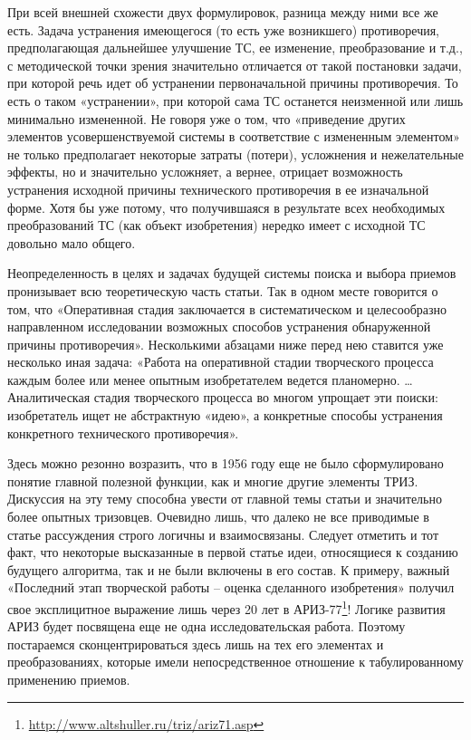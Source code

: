 \documentclass[11pt,a4paper]{article}
\begin{document}
При всей внешней схожести двух формулировок, разница между ними все же
есть. Задача устранения имеющегося (то есть уже возникшего) противоречия,
предполагающая дальнейшее улучшение ТС, ее изменение, преобразование и т.д., с
методической точки зрения значительно отличается от такой постановки задачи,
при которой речь идет об устранении первоначальной причины противоречия. То
есть о таком «устранении», при которой сама ТС останется неизменной или лишь
минимально измененной. Не говоря уже о том, что «приведение других элементов
усовершенствуемой системы в соответствие с измененным элементом» не только
предполагает некоторые затраты (потери), усложнения и нежелательные эффекты,
но и значительно усложняет, а вернее, отрицает возможность устранения исходной
причины технического противоречия в ее изначальной форме. Хотя бы уже потому,
что получившаяся в результате всех необходимых преобразований ТС (как объект
изобретения) нередко имеет с исходной ТС довольно мало общего.

Неопределенность в целях и задачах будущей системы поиска и выбора приемов
пронизывает всю теоретическую часть статьи. Так в одном месте говорится о том,
что «Оперативная стадия заключается в систематическом и целесообразно
направленном исследовании возможных способов устранения обнаруженной причины
противоречия». Несколькими абзацами ниже перед нею ставится уже несколько иная
задача: «Работа на оперативной стадии творческого процесса каждым более или
менее опытным изобретателем ведется планомерно. … Аналитическая стадия
творческого процесса во многом упрощает эти поиски: изобретатель ищет не
абстрактную «идею», а конкретные способы устранения конкретного технического
противоречия».

Здесь можно резонно возразить, что в 1956 году еще не было сформулировано
понятие главной полезной функции, как и многие другие элементы ТРИЗ. Дискуссия
на эту тему способна увести от главной темы статьи и значительно более опытных
тризовцев. Очевидно лишь, что далеко не все приводимые в статье рассуждения
строго логичны и взаимосвязаны. Следует отметить и тот факт, что некоторые
высказанные в первой статье идеи, относящиеся к созданию будущего алгоритма,
так и не были включены в его состав. К примеру, важный «Последний этап
творческой работы -- оценка сделанного изобретения» получил свое эксплицитное
выражение лишь через 20 лет в
АРИЗ-77\footnote{\url{http://www.altshuller.ru/triz/ariz71.asp}}! Логике
развития АРИЗ будет посвящена еще не одна исследовательская работа. Поэтому
постараемся сконцентрироваться здесь лишь на тех его элементах и
преобразованиях, которые имели непосредственное отношение к табулированному
применению приемов.
\end{document}
